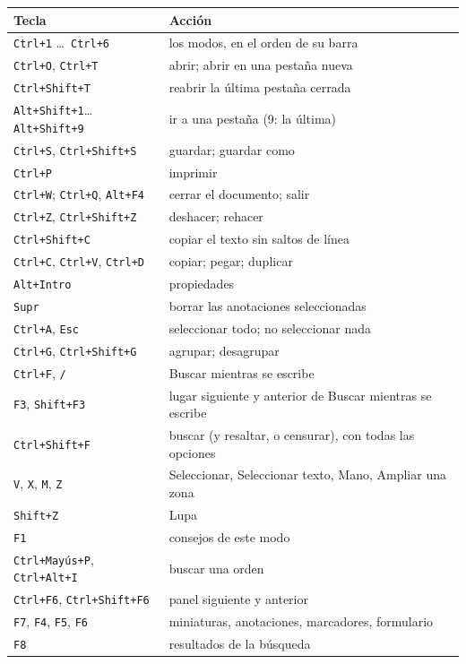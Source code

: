 \documentclass[12pt,
              article,
              oneside
              ]{memoir}
\newcommand*{\key}[1]{\texttt{#1}}
\begin{document}
\begin{longtable}{@{}>{\raggedright}p{}p{}@{}}
\toprule
Tecla & Acción\\
\midrule
\endhead
\key{Ctrl+1} \ldots\ \key{Ctrl+6} & los modos, en el orden de su barra\\
\key{Ctrl+O}, \key{Ctrl+T} & abrir; abrir en una pestaña nueva\\
\key{Ctrl+Shift+T} & reabrir la última pestaña cerrada\\
\key{Alt+Shift+1}\ldots\key{Alt+Shift+9} & ir a una pestaña (9: la última)\\
\key{Ctrl+S}, \key{Ctrl+Shift+S} & guardar; guardar como\\
\key{Ctrl+P} & imprimir\\
\key{Ctrl+W}; \key{Ctrl+Q}, \key{Alt+F4} & cerrar el documento; salir\\
\key{Ctrl+Z}, \key{Ctrl+Shift+Z} & deshacer; rehacer\\
\key{Ctrl+Shift+C} & copiar el texto sin saltos de línea\\
\key{Ctrl+C}, \key{Ctrl+V}, \key{Ctrl+D} & copiar; pegar; duplicar\\
\key{Alt+Intro} & propiedades\\
\key{Supr} & borrar las anotaciones seleccionadas\\
\key{Ctrl+A}, \key{Esc} & seleccionar todo; no seleccionar nada\\
\key{Ctrl+G}, \key{Ctrl+Shift+G} & agrupar; desagrupar\\
\key{Ctrl+F}, \key{/} & Buscar mientras se escribe\\
\key{F3}, \key{Shift+F3} & lugar siguiente y anterior de Buscar mientras se escribe\\
\key{Ctrl+Shift+F} & buscar (y resaltar, o censurar), con todas las opciones\\
\key{V}, \key{X}, \key{M}, \key{Z} & Seleccionar, Seleccionar texto, Mano, Ampliar una zona\\
\key{Shift+Z} & Lupa\\
\key{F1} & consejos de este modo\\
\key{Ctrl+Mayús+P}, \key{Ctrl+Alt+I} & buscar una orden\\
\key{Ctrl+F6}, \key{Ctrl+Shift+F6} & panel siguiente y anterior\\
\key{F7}, \key{F4}, \key{F5}, \key{F6} & miniaturas, anotaciones, marcadores, formulario\\
\key{F8} & resultados de la búsqueda\\

\end{longtable}
\end{document}
